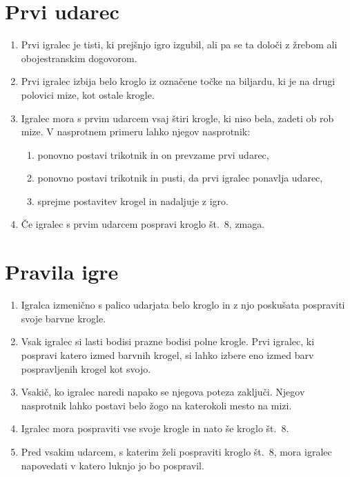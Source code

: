 \documentclass[a4paper,14pt]{extarticle}
\begin{document}
\begin{multicols}{2}
    \section{Prvi udarec}
    \begin{enumerate}
        \item Prvi igralec je tisti, ki prejšnjo igro izgubil, ali pa se ta določi z žrebom ali obojestranskim dogovorom.
        \item Prvi igralec izbija belo kroglo iz označene točke na biljardu, ki je na drugi polovici mize, kot ostale krogle.
        \item Igralec mora s prvim udarcem vsaj štiri krogle, ki niso bela, zadeti ob rob mize. V nasprotnem primeru lahko njegov nasprotnik:
        \begin{enumerate}
            \item ponovno postavi trikotnik in on prevzame prvi udarec,
            \item ponovno postavi trikotnik in pusti, da prvi igralec ponavlja udarec,
            \item sprejme postavitev krogel in nadaljuje z igro.
        \end{enumerate}
        \item Če igralec s prvim udarcem pospravi kroglo št.~8, zmaga.
    \end{enumerate}

    \section{Pravila igre}
    \begin{enumerate}
        \item Igralca izmenično s palico udarjata belo kroglo in z njo poskušata pospraviti svoje barvne krogle.
        \item Vsak igralec si lasti bodisi prazne bodisi polne krogle. Prvi igralec, ki pospravi katero izmed barvnih krogel, si lahko izbere eno izmed barv pospravljenih krogel kot svojo.
        \item Vsakič, ko igralec naredi napako se njegova poteza zaključi. Njegov nasprotnik lahko postavi belo žogo na katerokoli mesto na mizi.
        \item Igralec mora pospraviti vse svoje krogle in nato še kroglo št.~8.
        \item Pred vsakim udarcem, s katerim želi pospraviti kroglo št.~8, mora igralec napovedati v katero luknjo jo bo pospravil.
    \end{enumerate}


\end{multicols}
\end{document}
